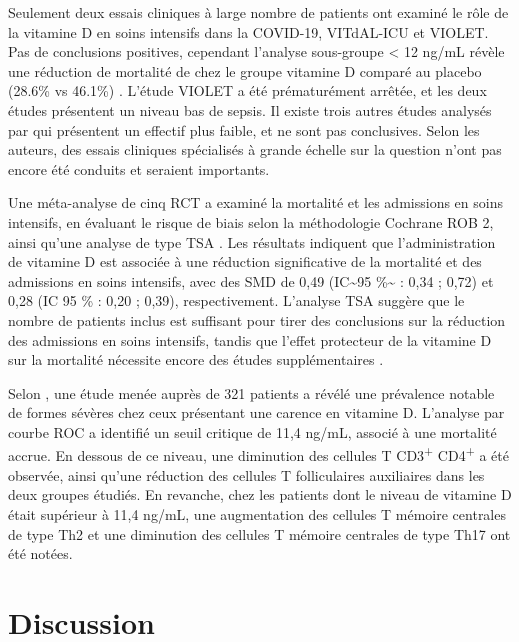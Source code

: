 \documentclass[
  a4paper,
  DIV=11,
  numbers=noendperiod,
  listof=totoc]{scrreprt}
\begin{document}
Seulement deux essais cliniques à large nombre de patients ont examiné
le rôle de la vitamine D en soins intensifs dans la COVID-19, VITdAL-ICU
et VIOLET. Pas de conclusions positives, cependant l'analyse sous-groupe
\textless{} 12 ng/mL révèle une réduction de mortalité de chez le groupe
vitamine D comparé au placebo (28.6\% vs 46.1\%) \autocite{Cutuli.2024}.
L'étude VIOLET a été prématurément arrêtée, et les deux études
présentent un niveau bas de sepsis. Il existe trois autres études
analysés par \textcite{Cutuli.2024} qui présentent un effectif plus
faible, et ne sont pas conclusives. Selon les auteurs, des essais
cliniques spécialisés à grande échelle sur la question n'ont pas encore
été conduits et seraient importants.

Une méta-analyse de cinq \ac{RCT} a examiné la mortalité et les
admissions en soins intensifs, en évaluant le risque de biais selon la
méthodologie Cochrane ROB 2, ainsi qu'une analyse de type \ac{TSA}
\autocite{Kang.2021}. Les résultats indiquent que l'administration de
vitamine D est associée à une réduction significative de la mortalité et
des admissions en soins intensifs, avec des \ac{SMD} de 0,49
(IC\textasciitilde95 \%\textasciitilde{} : 0,34 ; 0,72) et 0,28 (IC 95
\% : 0,20 ; 0,39), respectivement. L'analyse \ac{TSA} suggère que le
nombre de patients inclus est suffisant pour tirer des conclusions sur
la réduction des admissions en soins intensifs, tandis que l'effet
protecteur de la vitamine D sur la mortalité nécessite encore des études
supplémentaires \autocite{Argano.2023}.

Selon \textcite{Karonova.2022.pharmaceuticals}, une étude menée auprès
de 321 patients a révélé une prévalence notable de formes sévères chez
ceux présentant une carence en vitamine D. L'analyse par courbe ROC a
identifié un seuil critique de 11,4 ng/mL, associé à une mortalité
accrue. En dessous de ce niveau, une diminution des cellules T
CD3\textsuperscript{+} CD4\textsuperscript{+} a été observée, ainsi
qu'une réduction des cellules T folliculaires auxiliaires dans les deux
groupes étudiés. En revanche, chez les patients dont le niveau de
vitamine D était supérieur à 11,4 ng/mL, une augmentation des cellules T
mémoire centrales de type Th2 et une diminution des cellules T mémoire
centrales de type Th17 ont été notées.

\section{Discussion}\label{discussion}
\end{document}

